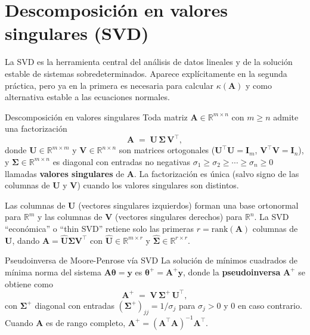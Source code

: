 \section{Descomposición en valores singulares (SVD)}
\label{ap:svd}

La SVD es la herramienta central del análisis de datos lineales y de la
solución estable de sistemas sobredeterminados. Aparece explícitamente en
la segunda práctica, pero ya en la primera es necesaria para calcular
$\kappa(\mathbf{A})$ y como alternativa estable a las ecuaciones normales.

\begin{teorema}{Descomposición en valores singulares}
\label{thm:svd}
Toda matriz $\mathbf{A} \in \mathbb{R}^{m \times n}$ con $m \geq n$ admite
una factorización
\[
  \mathbf{A} \;=\; \mathbf{U}\,\boldsymbol{\Sigma}\,\mathbf{V}^\top,
\]
donde $\mathbf{U} \in \mathbb{R}^{m \times m}$ y
$\mathbf{V} \in \mathbb{R}^{n \times n}$ son matrices ortogonales
($\mathbf{U}^\top\mathbf{U} = \mathbf{I}_m$,
$\mathbf{V}^\top\mathbf{V} = \mathbf{I}_n$), y
$\boldsymbol{\Sigma} \in \mathbb{R}^{m \times n}$ es diagonal con entradas
no negativas $\sigma_1 \geq \sigma_2 \geq \cdots \geq \sigma_n \geq 0$
llamadas \textbf{valores singulares} de $\mathbf{A}$. La factorización es
única (salvo signo de las columnas de $\mathbf{U}$ y $\mathbf{V}$) cuando
los valores singulares son distintos.
\end{teorema}

Las columnas de $\mathbf{U}$ (vectores singulares izquierdos) forman una
base ortonormal para $\mathbb{R}^m$ y las columnas de $\mathbf{V}$ (vectores
singulares derechos) para $\mathbb{R}^n$. La SVD ``económica'' o ``thin
SVD'' retiene solo las primeras $r = \mathrm{rank}(\mathbf{A})$ columnas
de $\mathbf{U}$, dando $\mathbf{A} = \hat{\mathbf{U}}\hat{\boldsymbol{\Sigma}}
\mathbf{V}^\top$ con $\hat{\mathbf{U}} \in \mathbb{R}^{m\times r}$ y
$\hat{\boldsymbol{\Sigma}} \in \mathbb{R}^{r \times r}$.

\begin{proposicion}{Pseudoinversa de Moore-Penrose vía SVD}
\label{prop:pseudoinversa}
La solución de mínimos cuadrados de mínima norma del sistema
$\mathbf{A}\boldsymbol{\theta} = \mathbf{y}$ es
$\boldsymbol{\theta}^+ = \mathbf{A}^+\mathbf{y}$, donde la
\textbf{pseudoinversa} $\mathbf{A}^+$ se obtiene como
\[
  \mathbf{A}^+ \;=\; \mathbf{V}\,\boldsymbol{\Sigma}^+\,\mathbf{U}^\top,
\]
con $\boldsymbol{\Sigma}^+$ diagonal con entradas
$(\boldsymbol{\Sigma}^+)_{jj} = 1/\sigma_j$ para $\sigma_j > 0$
y $0$ en caso contrario.
Cuando $\mathbf{A}$ es de rango completo, $\mathbf{A}^+ = (\mathbf{A}^\top\mathbf{A})^{-1}\mathbf{A}^\top$.
\end{proposicion}

